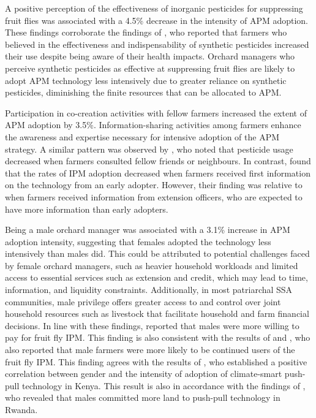 \documentclass[fleqn,twoside,reqno]{article}
\begin{document}
A positive perception of the effectiveness of inorganic pesticides for suppressing fruit flies was associated with a 4.5\% decrease in the intensity of APM adoption. These findings corroborate the findings of \cite{Schreinemachers2017}, who reported that farmers who believed in the effectiveness and indispensability of synthetic pesticides increased their use despite being aware of their health impacts. Orchard managers who perceive synthetic pesticides as effective at suppressing fruit flies are likely to adopt APM technology less intensively due to greater reliance on synthetic pesticides, diminishing the finite resources that can be allocated to APM. 

Participation in co-creation activities with fellow farmers increased the extent of APM adoption by 3.5\%. Information-sharing activities among farmers enhance the awareness and expertise necessary for intensive adoption of the APM strategy. A similar pattern was observed by \cite{Schreinemachers2017}, who noted that pesticide usage decreased when farmers consulted fellow friends or neighbours. In contrast, \cite{Murage2015} found that the rates of IPM adoption decreased when farmers received first information on the technology from an early adopter. However, their finding was relative to when farmers received information from extension officers, who are expected to have more information than early adopters.

Being a male orchard manager was associated with a 3.1\% increase in APM adoption intensity, suggesting that females adopted the technology less intensively than males did. This could be attributed to potential challenges faced by female orchard managers, such as heavier household workloads and limited access to essential services such as extension and credit, which may lead to time, information, and liquidity constraints. Additionally, in most patriarchal SSA communities, male privilege offers greater access to and control over joint household resources such as livestock that facilitate household and farm financial decisions. In line with these findings, \cite{Muriithi2021} reported that males were more willing to pay for fruit fly IPM. This finding is also consistent with the results of \cite{Wangithi2021} and \cite{Otieno2023}, who also reported that male farmers were more likely to be continued users of the fruit fly IPM. This finding agrees with the results of \cite{Murage2015}, who established a positive correlation between gender and the intensity of adoption of climate-smart push-pull technology in Kenya. This result is also in accordance with the findings of \cite{Misango2022}, who revealed that males committed more land to push-pull technology in Rwanda.
\end{document}
